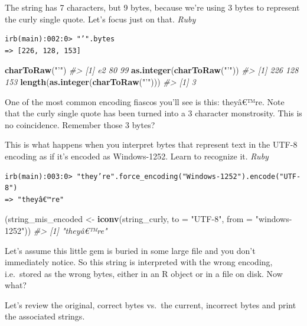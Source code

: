 \documentclass[
]{book}
\newenvironment{Shaded}{\begin{snugshade}}{\end{snugshade}}
\newcommand{\CommentTok}[1]{\textcolor[rgb]{0.56,0.35,0.01}{\textit{#1}}}
\newcommand{\DataTypeTok}[1]{\textcolor[rgb]{0.13,0.29,0.53}{#1}}
\newcommand{\KeywordTok}[1]{\textcolor[rgb]{0.13,0.29,0.53}{\textbf{#1}}}
\newcommand{\NormalTok}[1]{#1}
\newcommand{\StringTok}[1]{\textcolor[rgb]{0.31,0.60,0.02}{#1}}
\begin{document}
The string has 7 characters, but 9 bytes, because we're using 3 bytes to represent the curly single quote. Let's focus just on that. \emph{Ruby}

\begin{verbatim}
irb(main):002:0> "’".bytes
=> [226, 128, 153]
\end{verbatim}

\begin{Shaded}
\begin{Highlighting}[]
\KeywordTok{charToRaw}\NormalTok{(}\StringTok{"’"}\NormalTok{)}
\CommentTok{#> [1] e2 80 99}
\KeywordTok{as.integer}\NormalTok{(}\KeywordTok{charToRaw}\NormalTok{(}\StringTok{"’"}\NormalTok{))}
\CommentTok{#> [1] 226 128 153}
\KeywordTok{length}\NormalTok{(}\KeywordTok{as.integer}\NormalTok{(}\KeywordTok{charToRaw}\NormalTok{(}\StringTok{"’"}\NormalTok{)))}
\CommentTok{#> [1] 3}
\end{Highlighting}
\end{Shaded}

One of the most common encoding fiascos you'll see is this: theyâ€™re. Note that the curly single quote has been turned into a 3 character monstrosity. This is no coincidence. Remember those 3 bytes?

This is what happens when you interpret bytes that represent text in the UTF-8 encoding as if it's encoded as Windows-1252. Learn to recognize it. \emph{Ruby}

\begin{verbatim}
irb(main):003:0> "they’re".force_encoding("Windows-1252").encode("UTF-8")
=> "theyâ€™re"
\end{verbatim}

\begin{Shaded}
\begin{Highlighting}[]
\NormalTok{(string_mis_encoded <-}\StringTok{ }\KeywordTok{iconv}\NormalTok{(string_curly, }\DataTypeTok{to =} \StringTok{"UTF-8"}\NormalTok{, }\DataTypeTok{from =} \StringTok{"windows-1252"}\NormalTok{))}
\CommentTok{#> [1] "theyâ€™re"}
\end{Highlighting}
\end{Shaded}

Let's assume this little gem is buried in some large file and you don't immediately notice. So this string is interpreted with the wrong encoding, i.e.~stored as the wrong bytes, either in an R object or in a file on disk. Now what?

Let's review the original, correct bytes vs.~the current, incorrect bytes and print the associated strings.
\end{document}
